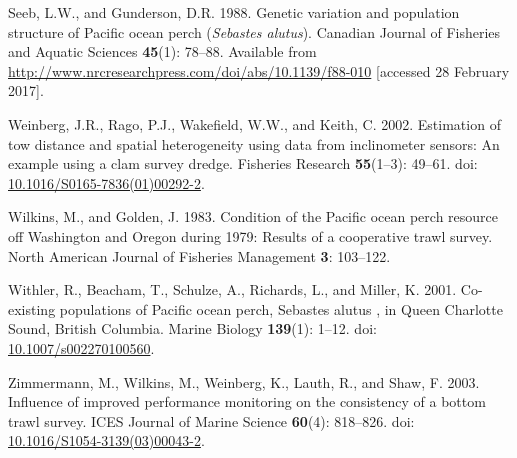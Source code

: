 \documentclass[12pt,]{article}
\begin{document}
\hypertarget{ref-seeb_genetic_1988}{}
Seeb, L.W., and Gunderson, D.R. 1988. Genetic variation and population
structure of Pacific ocean perch (\emph{Sebastes alutus}). Canadian
Journal of Fisheries and Aquatic Sciences \textbf{45}(1): 78--88.
Available from
\url{http://www.nrcresearchpress.com/doi/abs/10.1139/f88-010}
{[}accessed 28 February 2017{]}.

\hypertarget{ref-weinberg_estimation_2002}{}
Weinberg, J.R., Rago, P.J., Wakefield, W.W., and Keith, C. 2002.
Estimation of tow distance and spatial heterogeneity using data from
inclinometer sensors: An example using a clam survey dredge. Fisheries
Research \textbf{55}(1--3): 49--61. doi:
\href{https://doi.org/10.1016/S0165-7836(01)00292-2}{10.1016/S0165-7836(01)00292-2}.

\hypertarget{ref-wilkins_condition_1983}{}
Wilkins, M., and Golden, J. 1983. Condition of the Pacific ocean perch
resource off Washington and Oregon during 1979: Results of a cooperative
trawl survey. North American Journal of Fisheries Management \textbf{3}:
103--122.

\hypertarget{ref-withler_co-existing_2001}{}
Withler, R., Beacham, T., Schulze, A., Richards, L., and Miller, K.
2001. Co-existing populations of Pacific ocean perch, Sebastes alutus ,
in Queen Charlotte Sound, British Columbia. Marine Biology
\textbf{139}(1): 1--12. doi:
\href{https://doi.org/10.1007/s002270100560}{10.1007/s002270100560}.

\hypertarget{ref-zimmermann_influence_2003}{}
Zimmermann, M., Wilkins, M., Weinberg, K., Lauth, R., and Shaw, F. 2003.
Influence of improved performance monitoring on the consistency of a
bottom trawl survey. ICES Journal of Marine Science \textbf{60}(4):
818--826. doi:
\href{https://doi.org/10.1016/S1054-3139(03)00043-2}{10.1016/S1054-3139(03)00043-2}.
\end{document}
